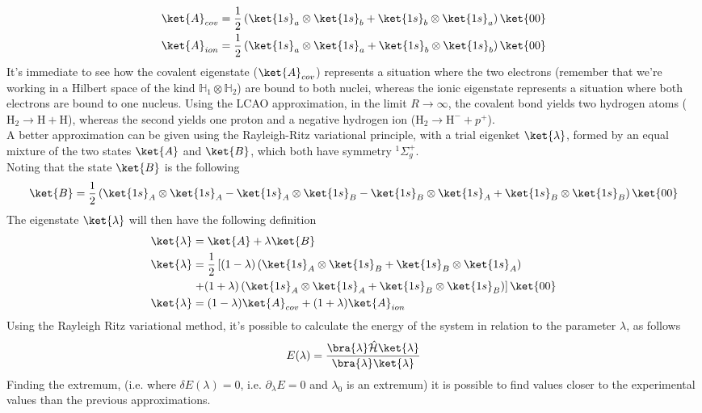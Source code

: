 \documentclass[a4paper, 11pt]{book}
\newcommand{\1}{\opr{\mathds{1}}}
\newcommand{\ham}{\mathcal{H}}
\newcommand{\opr}[1]{\hat{#1}}
\newcommand{\term}[3][]{^{#3}#2_{#1}}
\theoremstyle{plain}
\begin{document}
	\begin{equation}
		\begin{aligned}
			\ket{A}_{cov}&=\frac{1}{2}\left( \ket{1s}_a\otimes\ket{1s}_b+\ket{1s}_b\otimes\ket{1s}_a \right)\ket{00}\\
			\ket{A}_{ion}&=\frac{1}{2}\left( \ket{1s}_a\otimes\ket{1s}_a+\ket{1s}_b\otimes\ket{1s}_b \right)\ket{00}
		\end{aligned}
		\label{eq:ioniccovalentbonding}
	\end{equation}
	It's immediate to see how the covalent eigenstate ($\ket{A}_{cov}$) represents a situation where the two electrons (remember that we're working in a Hilbert space of the kind $\mathbb{H}_1\otimes\mathbb{H}_2$) are bound to both nuclei, whereas the ionic eigenstate represents a situation where both electrons are bound to one nucleus. Using the LCAO approximation, in the limit $R\to\infty$, the covalent bond yields two hydrogen atoms ($\mathrm{H}_2\to\mathrm{H}+\mathrm{H}$), whereas the second yields one proton and a negative hydrogen ion ($\mathrm{H}_2\to\mathrm{H}^-+p^+$).\\
	A better approximation can be given using the Rayleigh-Ritz variational principle, with a trial eigenket $\ket{\lambda}$, formed by an equal mixture of the two states $\ket{A}$ and $\ket{B}$, which both have symmetry $\term[g]{\Sigma^+}{1}$.\\
	Noting that the state $\ket{B}$ is the following
	\begin{equation*}
		\ket{B}=\frac{1}{2}\left( \ket{1s}_A\otimes\ket{1s}_A-\ket{1s}_A\otimes\ket{1s}_B-\ket{1s}_B\otimes\ket{1s}_A+\ket{1s}_B\otimes\ket{1s}_B \right)\ket{00}
	\end{equation*}
	The eigenstate $\ket{\lambda}$ will then have the following definition
	\begin{equation}
		\begin{aligned}
			\ket{\lambda}&=\ket{A}+\lambda\ket{B}\\
			\ket{\lambda}&=\frac{1}{2}\left[ (1-\lambda)\left( \ket{1s}_A\otimes\ket{1s}_B+\ket{1s}_B\otimes\ket{1s}_A \right)\right.\\
			&\left.+(1+\lambda)\left( \ket{1s}_A\otimes\ket{1s}_A+\ket{1s}_B\otimes\ket{1s}_B \right) \right]\ket{00}\\
			\ket{\lambda}&=(1-\lambda)\ket{A}_{cov}+(1+\lambda)\ket{A}_{ion}
		\end{aligned}
		\label{eq:ketlambda}
	\end{equation}
	Using the Rayleigh Ritz variational method, it's possible to calculate the energy of the system in relation to the parameter $\lambda$, as follows
	\begin{equation}
		E(\lambda)=\frac{\bra{\lambda}\opr{\ham}\ket{\lambda}}{\bra{\lambda}\ket{\lambda}}
		\label{eq:rayleighritzvariationalmolen}
	\end{equation}
	Finding the extremum, (i.e. where $\delta E(\lambda)=0$, i.e. $\partial_{\lambda}E=0$ and $\lambda_0$ is an extremum) it is possible to find values closer to the experimental values than the previous approximations.
\end{document}
